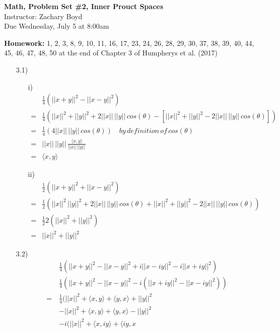 \documentclass[letterpaper,12pt]{article}
\theoremstyle{definition}
\begin{document}
\begin{flushleft}
   \textbf{\large{Math, Problem Set \#2, Inner Prouct Spaces}} \\[5pt] Instructor: Zachary Boyd \\[5pt]
   Due Wednesday, July 5 at 8:00am
\end{flushleft}
\textbf{Homework:} 1, 2, 3, 8, 9, 10, 11, 16, 17, 23, 24, 26, 28, 29, 30, 37, 38, 39, 40, 44, 45, 46,
47, 48, 50 at the end of Chapter 3 of Humpherys et al. (2017)
\begin{enumerate}
\item[3.1)] 
\begin{itemize}
\item[i)]
\begin{align*}
&\frac{1}{4} \left( ||x+y||^2 - ||x-y||^2 \right) \\
=&\frac{1}{4} \left(||x||^2  +||y||^2 + 2||x||\,||y||\,cos(\theta) - [||x||^2  +||y||^2 - 2||x||\,||y|| \, cos(\theta) ] \right) \\
=& \frac{1}{4} \left( 4 ||x||\, ||y|| \, cos(\theta) \right) \quad by \,  definition \, of \, cos(\theta)\\
=&||x||\, ||y|| \, \frac{\langle x,y\rangle}{||x||\, ||y|| \,} \\
=& \langle x ,y\rangle
\end{align*}
\item[ii)] 
\begin{align*}
&\frac{1}{2} \left( ||x+y||^2 + ||x-y||^2 \right) \\
=& \frac{1}{2} \left( ||x||^2 \, ||y||^2 + 2||x||\,||y||\,cos(\theta)  +    ||x||^2  +||y||^2 - 2||x||\,||y|| \, cos(\theta) \right) \\
=& \frac{1}{2} 2 \left( ||x||^2+||y||^2  \right) \\
=& ||x||^2+||y||^2 
\end{align*}
\end{itemize}
\item[3.2)]
\begin{align*}
&\frac{1}{4} \left( ||x+y||^2 - ||x-y||^2  + i||x-iy||^2 - i||x+iy||^2 \right) \\
&\frac{1}{4} \left( ||x+y||^2 - ||x-y||^2  - i(||x+iy||^2 - ||x-iy||^2  )\right) \\
=& \frac{1}{4} ( ||x||^2 +\langle x, y \rangle +\langle  y ,x
\rangle +||y||^2 \\ 
\quad & - ||x||^2 +\langle x, y \rangle +\langle  y ,x\rangle -||y||^2 \\
\quad &-i( ||x||^2 +\langle x, iy \rangle +\langle  iy ,x

\end{align*}
\end{enumerate}
\end{document}
